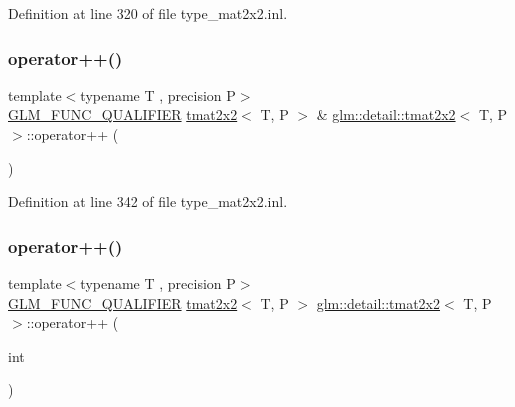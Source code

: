 Definition at line 320 of file type\+\_\+mat2x2.\+inl.

\mbox{\label{structglm_1_1detail_1_1tmat2x2_ab22b8afc9da04be4ff28de825ccf0176}} 
\subsubsection{\texorpdfstring{operator++()}{operator++()}\hspace{0.1cm}{\footnotesize\ttfamily [1/2]}}
{\footnotesize\ttfamily template$<$typename T , precision P$>$ \\
\hyperlink{setup_8hpp_a33fdea6f91c5f834105f7415e2a64407}{G\+L\+M\+\_\+\+F\+U\+N\+C\+\_\+\+Q\+U\+A\+L\+I\+F\+I\+ER} \hyperlink{structglm_1_1detail_1_1tmat2x2}{tmat2x2}$<$ T, P $>$ \& \hyperlink{structglm_1_1detail_1_1tmat2x2}{glm\+::detail\+::tmat2x2}$<$ T, P $>$\+::operator++ (\begin{DoxyParamCaption}{ }\end{DoxyParamCaption})}



Definition at line 342 of file type\+\_\+mat2x2.\+inl.

\mbox{\label{structglm_1_1detail_1_1tmat2x2_ab0857ca1fc8ebaf4f2999d64837efb08}} 
\subsubsection{\texorpdfstring{operator++()}{operator++()}\hspace{0.1cm}{\footnotesize\ttfamily [2/2]}}
{\footnotesize\ttfamily template$<$typename T , precision P$>$ \\
\hyperlink{setup_8hpp_a33fdea6f91c5f834105f7415e2a64407}{G\+L\+M\+\_\+\+F\+U\+N\+C\+\_\+\+Q\+U\+A\+L\+I\+F\+I\+ER} \hyperlink{structglm_1_1detail_1_1tmat2x2}{tmat2x2}$<$ T, P $>$ \hyperlink{structglm_1_1detail_1_1tmat2x2}{glm\+::detail\+::tmat2x2}$<$ T, P $>$\+::operator++ (\begin{DoxyParamCaption}\item[{int}]{ }\end{DoxyParamCaption})}



